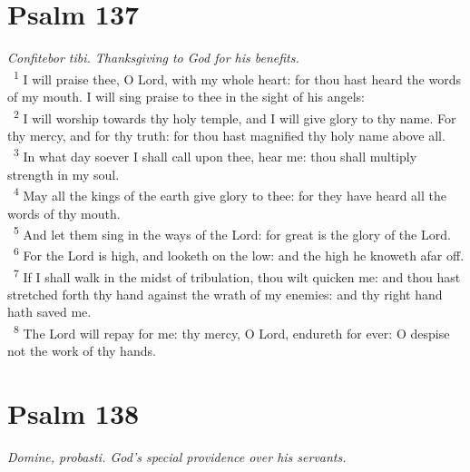 \documentclass[a5paper,12pt]{article}
\begin{document}
\begin{multicols*}{2}
\section{Psalm 137}
\label{sec:orgf08f0d9}
\emph{Confitebor tibi. Thanksgiving to God for his benefits.}\\

~\textsuperscript{1} I will praise thee, O Lord, with my whole heart: for thou hast heard the words of my mouth. I will sing praise to thee in the sight of his angels:\\
~\textsuperscript{2} I will worship towards thy holy temple, and I will give glory to thy name. For thy mercy, and for thy truth: for thou hast magnified thy holy name above all.\\
~\textsuperscript{3} In what day soever I shall call upon thee, hear me: thou shall multiply strength in my soul.\\
~\textsuperscript{4} May all the kings of the earth give glory to thee: for they have heard all the words of thy mouth.\\
~\textsuperscript{5} And let them sing in the ways of the Lord: for great is the glory of the Lord.\\
~\textsuperscript{6} For the Lord is high, and looketh on the low: and the high he knoweth afar off.\\
~\textsuperscript{7} If I shall walk in the midst of tribulation, thou wilt quicken me: and thou hast stretched forth thy hand against the wrath of my enemies: and thy right hand hath saved me.\\
~\textsuperscript{8} The Lord will repay for me: thy mercy, O Lord, endureth for ever: O despise not the work of thy hands.\\

\section{Psalm 138}
\label{sec:orgedbe0ea}
\emph{Domine, probasti. God's special providence over his servants.}\\


\end{multicols*}
\end{document}
